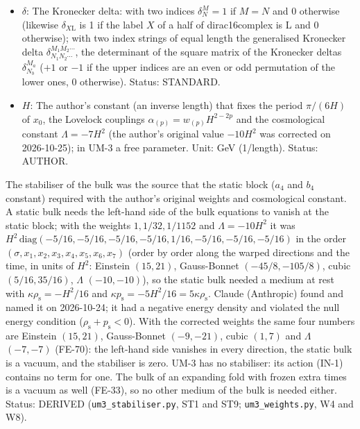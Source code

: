 \documentclass[
  10pt,
]{article}
\begin{document}
\begin{itemize}
  the static block is a vacuum (its Lovelock tensors add to \(7H^2\) in
  every direction). The author's original value was \(\Lambda = -10H^2\)
  (he writes the pure number \(\Lambda_{\mathrm{N}} = 10\) in
  \(0 = -\Lambda_{\mathrm{N}} + \sum_p H^{-2p}w_{(p)}\mathcal{E}_{(p)}\)).
  Unit: GeV\(^2\). Value: \(-7H^2\); the author's original \(-10H^2\).
  Status: AUTHOR (the term), DERIVED (the value).
\item
  \(\delta\): The Kronecker delta: with two indices \(\delta^M_N = 1\)
  if \(M = N\) and 0 otherwise (likewise \(\delta_{X\mathrm{L}}\) is 1
  if the label \(X\) of a half of dirac16complex is L and 0 otherwise);
  with two index strings of equal length the generalised Kronecker delta
  \(\delta^{M_1M_2\cdots}_{N_1N_2\cdots}\), the determinant of the
  square matrix of the Kronecker deltas \(\delta^{M_a}_{N_b}\) (\(+1\)
  or \(-1\) if the upper indices are an even or odd permutation of the
  lower ones, 0 otherwise). Status: STANDARD.
\item
  \(H\): The author's constant (an inverse length) that fixes the period
  \(\pi/(6H)\) of \(x_0\), the Lovelock couplings
  \(\alpha_{(p)} = w_{(p)}H^{2-2p}\) and the cosmological constant
  \(\Lambda = -7H^2\) (the author's original value \(-10H^2\) was
  corrected on 2026-10-25); in UM-3 a free parameter. Unit: GeV
  (1/length). Status: AUTHOR.
\end{itemize}

The stabiliser of the bulk was the source that the static block (\(a_4\)
and \(b_4\) constant) required with the author's original weights and
cosmological constant. A static bulk needs the left-hand side of the
bulk equations to vanish at the static block; with the weights
\(1, 1/32, 1/1152\) and \(\Lambda = -10H^2\) it was
\(H^2\,\mathrm{diag}(-5/16, -5/16, -5/16, -5/16, 1/16, -5/16, -5/16, -5/16)\)
in the order \((\sigma, x_1, x_2, x_3, x_4, x_5, x_6, x_7)\) (order by
order along the warped directions and the time, in units of \(H^2\):
Einstein \((15, 21)\), Gauss-Bonnet \((-45/8, -105/8)\), cubic
\((5/16, 35/16)\), \(\Lambda\) \((-10, -10)\)), so the static bulk
needed a medium at rest with \(\kappa\rho_{\mathrm{s}} = -H^2/16\) and
\(\kappa p_{\mathrm{s}} = -5H^2/16 = 5\kappa\rho_{\mathrm{s}}\). Claude
(Anthropic) found and named it on 2026-10-24; it had a negative energy
density and violated the null energy condition
(\(\rho_{\mathrm{s}} + p_{\mathrm{s}} < 0\)). With the corrected weights
the same four numbers are Einstein \((15, 21)\), Gauss-Bonnet
\((-9, -21)\), cubic \((1, 7)\) and \(\Lambda\) \((-7, -7)\) (FE-70):
the left-hand side vanishes in every direction, the static bulk is a
vacuum, and the stabiliser is zero. UM-3 has no stabiliser: its action
(IN-1) contains no term for one. The bulk of an expanding fold with
frozen extra times is a vacuum as well (FE-33), so no other medium of
the bulk is needed either. Status: DERIVED (\texttt{um3\_stabiliser.py},
ST1 and ST9; \texttt{um3\_weights.py}, W4 and W8).
\end{document}
